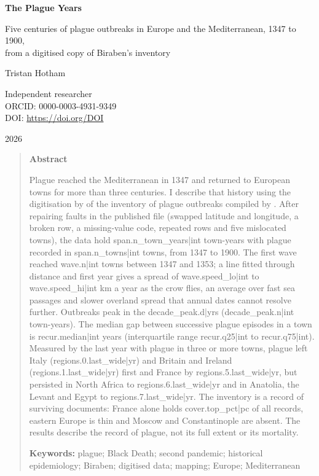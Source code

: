 \documentclass[11pt,a4paper]{article}
\begin{document}
\begin{center}
{\Large\bfseries The Plague Years\par}
\vspace{0.4em}
{\large Five centuries of plague outbreaks in Europe and the Mediterranean, 1347 to 1900,\\from a digitised copy of Biraben's inventory\par}
\vspace{1.2em}
{\large Tristan Hotham\par}
\vspace{0.3em}
{\small Independent researcher\\
ORCID: 0000-0003-4931-9349\\
DOI: \href{https://doi.org/{{DOI}}}{https://doi.org/{{DOI}}}\par}
\vspace{0.8em}
2026
\end{center}

\begin{quote}
\small
\begin{center}\textbf{Abstract}\end{center}
Plague reached the Mediterranean in 1347 and returned to European towns for more than three centuries. I describe that history using the digitisation by \citet{buntgen2012} of the inventory of plague outbreaks compiled by \citet{biraben1975}. After repairing faults in the published file (swapped latitude and longitude, a broken row, a missing-value code, repeated rows and five mislocated towns), the data hold {{span.n_town_years|int}} town-years with plague recorded in {{span.n_towns|int}} towns, from 1347 to 1900. The first wave reached {{wave.n|int}} towns between 1347 and 1353; a line fitted through distance and first year gives a spread of {{wave.speed_lo|int}} to {{wave.speed_hi|int}} km a year as the crow flies, an average over fast sea passages and slower overland spread that annual dates cannot resolve further. Outbreaks peak in the {{decade_peak.d|yr}}s ({{decade_peak.n|int}} town-years). The median gap between successive plague episodes in a town is {{recur.median|int}} years (interquartile range {{recur.q25|int}} to {{recur.q75|int}}). Measured by the last year with plague in three or more towns, plague left Italy ({{regions.0.last_wide|yr}}) and Britain and Ireland ({{regions.1.last_wide|yr}}) first and France by {{regions.5.last_wide|yr}}, but persisted in North Africa to {{regions.6.last_wide|yr}} and in Anatolia, the Levant and Egypt to {{regions.7.last_wide|yr}}. The inventory is a record of surviving documents: France alone holds {{cover.top_pct|pc}} of all records, eastern Europe is thin and Moscow and Constantinople are absent. The results describe the record of plague, not its full extent or its mortality.

\textbf{Keywords:} plague; Black Death; second pandemic; historical epidemiology; Biraben; digitised data; mapping; Europe; Mediterranean
\end{quote}
\end{document}
